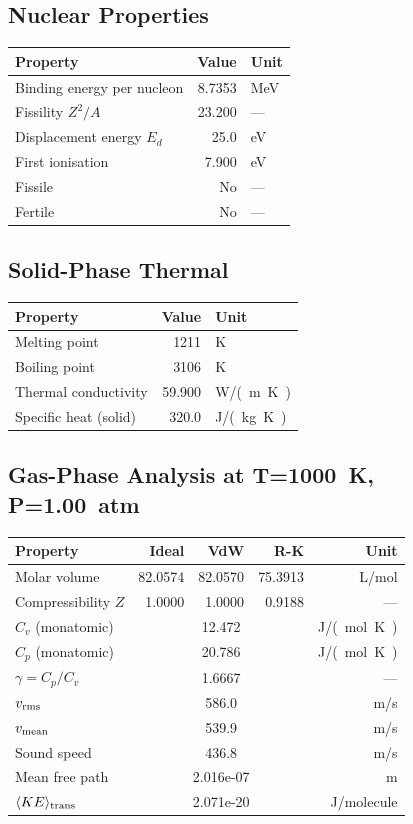 \documentclass[11pt,a4paper]{article}
\begin{document}
\subsection{Nuclear Properties}
\begin{tabular}{lrl}
  \toprule
  Property & Value & Unit \\
  \midrule
  Binding energy per nucleon & 8.7353 & \si{MeV} \\
  Fissility $Z^2/A$ & 23.200 & --- \\
  Displacement energy $E_d$ & 25.0 & \si{eV} \\
  First ionisation & 7.900 & \si{eV} \\
  Fissile & No & --- \\
  Fertile & No & --- \\
  \bottomrule
\end{tabular}

\subsection{Solid-Phase Thermal}
\begin{tabular}{lrl}
  \toprule
  Property & Value & Unit \\
  \midrule
  Melting point & 1211 & \si{K} \\
  Boiling point & 3106 & \si{K} \\
  Thermal conductivity & 59.900 & \si{W/(m.K)} \\
  Specific heat (solid) & 320.0 & \si{J/(kg.K)} \\
  \bottomrule
\end{tabular}

\subsection{Gas-Phase Analysis at T=\SI{1000}{K}, P=\SI{1.00}{atm}}
\begin{tabular}{lrrrr}
  \toprule
  Property & Ideal & VdW & R-K & Unit \\
  \midrule
  Molar volume & 82.0574 & 82.0570 & 75.3913 & \si{L/mol} \\
  Compressibility $Z$ & 1.0000 & 1.0000 & 0.9188 & --- \\
  \midrule
  $C_v$ (monatomic) & \multicolumn{3}{c}{12.472} & \si{J/(mol.K)} \\
  $C_p$ (monatomic) & \multicolumn{3}{c}{20.786} & \si{J/(mol.K)} \\
  $\gamma = C_p/C_v$ & \multicolumn{3}{c}{1.6667} & --- \\
  $v_{\rm rms}$ & \multicolumn{3}{c}{586.0} & \si{m/s} \\
  $v_{\rm mean}$ & \multicolumn{3}{c}{539.9} & \si{m/s} \\
  Sound speed & \multicolumn{3}{c}{436.8} & \si{m/s} \\
  Mean free path & \multicolumn{3}{c}{2.016e-07} & \si{m} \\
  $\langle KE \rangle_{\rm trans}$ & \multicolumn{3}{c}{2.071e-20} & \si{J/molecule} \\
  \bottomrule
\end{tabular}
\end{document}
